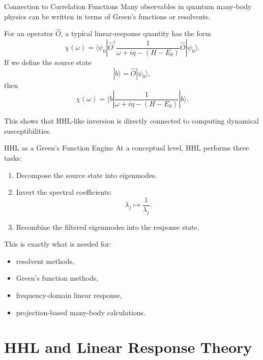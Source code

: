 \documentclass{beamer}
\begin{document}

\begin{frame}{Connection to Correlation Functions}
  Many observables in quantum many-body physics can be written in terms of Green's functions or resolvents.

  For an operator \(\hat{O}\), a typical linear-response quantity has the form
  \[
  \chi(\omega)
  =
  \langle \psi_0 |
  \hat{O}^\dagger
  \frac{1}{\omega + i\eta - (H-E_0)}
  \hat{O}
  |\psi_0\rangle.
  \]
  If we define the source state
  \[
  |b\rangle = \hat{O}|\psi_0\rangle,
  \]
  then
  \[
  \chi(\omega)
  =
  \langle b|
  \frac{1}{\omega + i\eta - (H-E_0)}
  |b\rangle.
  \]

  This shows that HHL-like inversion is directly connected to computing dynamical susceptibilities.
\end{frame}


\begin{frame}{HHL as a Green's Function Engine}
  At a conceptual level, HHL performs three tasks:
  \begin{enumerate}
  \item Decompose the source state into eigenmodes.
  \item Invert the spectral coefficients:
    \[
    \lambda_j \mapsto \frac{1}{\lambda_j}.
    \]
  \item Recombine the filtered eigenmodes into the response state.
  \end{enumerate}

  This is exactly what is needed for:
  \begin{itemize}
  \item resolvent methods,
  \item Green's function methods,
  \item frequency-domain linear response,
  \item projection-based many-body calculations.
  \end{itemize}
\end{frame}

\section{HHL and Linear Response Theory}
\end{document}
